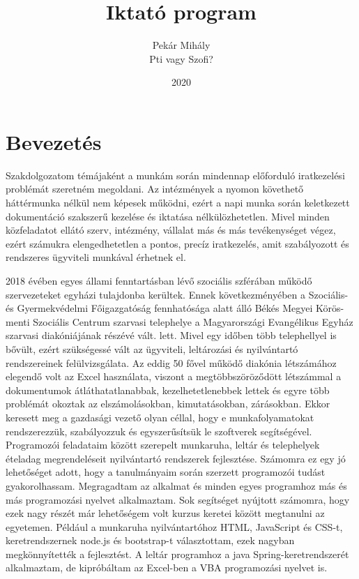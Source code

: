 \documentclass[
]{thesis-ekf}
\theoremstyle{definition}
\theoremstyle{remark}
\begin{document}
\title{Iktató program}
\author{Pekár Mihály\\Pti vagy Szofi?}
\date{2020}
\maketitle
\tableofcontents
\chapter{Bevezetés}

Szakdolgozatom témájaként a munkám során mindennap előforduló iratkezelési problémát szeretném megoldani. Az intézmények a nyomon követhető háttérmunka nélkül nem képesek működni, ezért a napi munka során keletkezett dokumentáció szakszerű kezelése és iktatása nélkülözhetetlen. Mivel minden közfeladatot ellátó szerv, intézmény, vállalat más és más tevékenységet végez, ezért számukra elengedhetetlen a pontos, precíz iratkezelés, amit szabályozott és rendszeres ügyviteli munkával érhetnek el.

2018 évében egyes állami fenntartásban lévő szociális szférában működő szervezeteket egyházi tulajdonba kerültek. Ennek következményében a Szociális- és Gyermekvédelmi Főigazgatóság fennhatósága alatt álló Békés Megyei Körös-menti Szociális Centrum szarvasi telephelye a Magyarországi Evangélikus Egyház szarvasi diakóniájának részévé vált. lett. Mivel egy időben több telephellyel is bővült, ezért szükségessé vált az ügyviteli, leltározási és nyilvántartó rendszereinek felülvizsgálata. Az eddig 50 fővel működő diakónia létszámához elegendő volt az Excel használata, viszont a megtöbbszöröződött létszámmal a dokumentumok átláthatatlanabbak, kezelhetetlenebbek lettek és egyre több problémát okoztak az elszámolásokban, kimutatásokban, zárásokban. Ekkor keresett meg a gazdasági vezető olyan céllal, hogy e munkafolyamatokat rendszerezzük, szabályozzuk és egyszerűsítsük le szoftverek segítségével. Programozói feladataim között szerepelt munkaruha, leltár és telephelyek ételadag megrendeléseit nyilvántartó rendszerek fejlesztése. Számomra ez egy jó lehetőséget adott, hogy a tanulmányaim során szerzett programozói tudást gyakorolhassam. Megragadtam az alkalmat és minden egyes programhoz más és más programozási nyelvet alkalmaztam. Sok segítséget nyújtott számomra, hogy ezek nagy részét már lehetőségem volt kurzus keretei között megtanulni az egyetemen. Például a munkaruha nyilvántartóhoz HTML, JavaScript és CSS-t, keretrendszernek node.js és bootstrap-t választottam, ezek nagyban megkönnyítették a fejlesztést. A leltár programhoz a java Spring-keretrendszerét alkalmaztam, de kipróbáltam az Excel-ben a VBA programozási nyelvet is.
\end{document}
